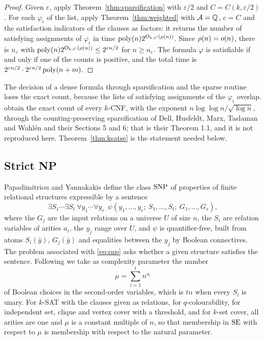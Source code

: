 \begin{proof}
Given $\varepsilon$, apply Theorem~\ref{thm:sparsification} with
$\varepsilon/2$ and $C=C(k,\varepsilon/2)$. For each $\varphi_i$ of the list,
apply Theorem~\ref{thm:weighted} with $\mathcal{A}=\mathbb{Q}$, $c=C$ and the satisfaction
indicators of the clauses as factors: it returns the number of satisfying
assignments of $\varphi_i$ in time $\operatorname{poly}(n)2^{O_{k,C}(\rho(n))}$. Since
$\rho(n)=o(n)$, there is $n_\varepsilon$ with
$\operatorname{poly}(n)2^{O_{k,C}(\rho(n))}\le2^{\varepsilon n/2}$ for $n\ge n_\varepsilon$.
The formula $\varphi$ is satisfiable if and only if one of the counts is
positive, and the total time is $2^{\varepsilon n/2}\cdot2^{\varepsilon n/2}\operatorname{poly}(n+m)$.
\end{proof}

\begin{remark}
The decision of a dense formula through sparsification and the sparse routine
loses the exact count, because the lists of satisfying assignments of the
$\varphi_i$ overlap. \oai{} obtain the exact count of every $k$-CNF, with the
exponent $n\log\log n/\sqrt{\log n}$, through the counting-preserving
sparsification of Dell, Husfeldt, Marx, Taslaman and Wahl\'en
\cite[Appendix A]{DHMTW14} and their Sections 5 and 6; that is their
Theorem 1.1, and it is not reproduced here. Theorem~\ref{thm:ksatse} is the
statement needed below.
\end{remark}

\subsection{Strict NP}
Papadimitriou and Yannakakis \cite{PY91} define the class $\operatorname{SNP}$ of properties
of finite relational structures expressible by a sentence
\begin{equation}\label{eq:snp}
  \exists S_1\cdots\exists S_t\ \forall y_1\cdots\forall y_r\ \ \psi(y_1,\dots,y_r;\ S_1,\dots,S_t;\ G_1,\dots,G_s),
\end{equation}
where the $G_j$ are the input relations on a universe $U$ of size $n$, the
$S_i$ are relation variables of arities $a_i$, the $y_j$ range over $U$, and
$\psi$ is quantifier-free, built from atoms $S_i(\bar y)$, $G_j(\bar y)$ and
equalities between the $y_j$ by Boolean connectives. The problem associated
with \eqref{eq:snp} asks whether a given structure satisfies the sentence.
Following \cite{IPZ01} we take as complexity parameter the number
\begin{equation}\label{eq:snpparam}
  \mu=\sum_{i=1}^{t}n^{a_i}
\end{equation}
of Boolean choices in the second-order variables, which is $tn$ when every
$S_i$ is unary. For $k$-SAT with the clauses given as relations, for
$q$-colourability, for independent set, clique and vertex cover with a
threshold, and for $k$-set cover, all arities are one and $\mu$ is a constant
multiple of $n$, so that membership in $\operatorname{SE}$ with respect to $\mu$ is
membership with respect to the natural parameter.

